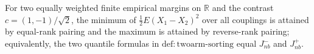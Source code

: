 For two equally weighted finite empirical margins on \(\mathbb R\) and the contrast \(c=(1,-1)/\sqrt2\), the minimum of \(\frac12E(X_1-X_2)^2\) over all couplings is attained by equal-rank pairing and the maximum is attained by reverse-rank pairing; equivalently, the two quantile formulas in \(\mathrm{def:twoarm\text{-}sorting}\) equal \(J_{nb}^{-}\) and \(J_{nb}^{+}\).